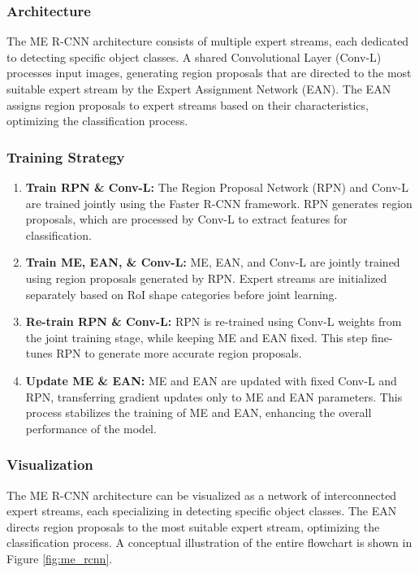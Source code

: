 \documentclass[journal, biblatex]{IEEEtran}
\begin{document}
\subsubsection{Architecture}
The ME R-CNN architecture consists of multiple expert streams, each dedicated to detecting specific object classes. A shared Convolutional Layer (Conv-L) processes input images, generating region proposals that are directed to the most suitable expert stream by the Expert Assignment Network (EAN). The EAN assigns region proposals to expert streams based on their characteristics, optimizing the classification process.

\subsubsection{Training Strategy}
\begin{enumerate}
    \item \textbf{Train RPN \& Conv-L:} The Region Proposal Network (RPN) and Conv-L are trained jointly using the Faster R-CNN framework. RPN generates region proposals, which are processed by Conv-L to extract features for classification.
    
    \item \textbf{Train ME, EAN, \& Conv-L:} ME, EAN, and Conv-L are jointly trained using region proposals generated by RPN. Expert streams are initialized separately based on RoI shape categories before joint learning.
    
    \item \textbf{Re-train RPN \& Conv-L:} RPN is re-trained using Conv-L weights from the joint training stage, while keeping ME and EAN fixed. This step fine-tunes RPN to generate more accurate region proposals.
    
    \item \textbf{Update ME \& EAN:} ME and EAN are updated with fixed Conv-L and RPN, transferring gradient updates only to ME and EAN parameters. This process stabilizes the training of ME and EAN, enhancing the overall performance of the model.
\end{enumerate}

\subsubsection{Visualization}
The ME R-CNN architecture can be visualized as a network of interconnected expert streams, each specializing in detecting specific object classes. The EAN directs region proposals to the most suitable expert stream, optimizing the classification process. A conceptual illustration of the entire flowchart is shown in Figure \ref{fig:me_rcnn}.
\end{document}
